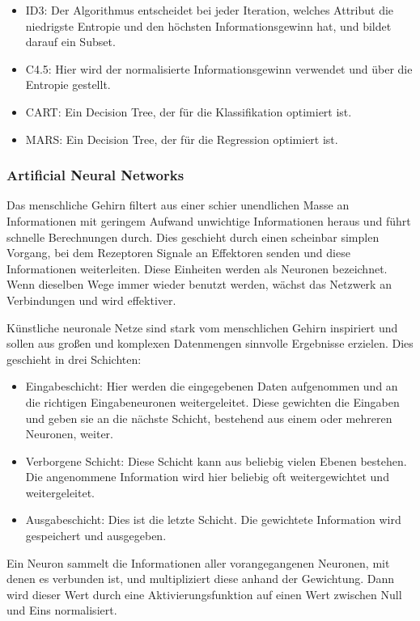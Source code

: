 \begin{itemize}
    \item ID3: Der Algorithmus entscheidet bei jeder Iteration, welches Attribut die niedrigste Entropie und den höchsten Informationsgewinn hat, und bildet darauf ein Subset.
    \item C4.5: Hier wird der normalisierte Informationsgewinn verwendet und über die Entropie gestellt.
    \item CART: Ein Decision Tree, der für die Klassifikation optimiert ist.
    \item MARS: Ein Decision Tree, der für die Regression optimiert ist.
\end{itemize}

\subsubsection{Artificial Neural Networks}
Das menschliche Gehirn filtert aus einer schier unendlichen Masse an Informationen mit geringem Aufwand unwichtige Informationen heraus und führt schnelle Berechnungen durch. Dies geschieht durch einen scheinbar simplen Vorgang, bei dem Rezeptoren Signale an Effektoren senden und diese Informationen weiterleiten. Diese Einheiten werden als Neuronen bezeichnet. Wenn dieselben Wege immer wieder benutzt werden, wächst das Netzwerk an Verbindungen und wird effektiver.\cite{stiftung2023nervensystem}

Künstliche neuronale Netze sind stark vom menschlichen Gehirn inspiriert und sollen aus großen und komplexen Datenmengen sinnvolle Ergebnisse erzielen. Dies geschieht in drei Schichten:\cite{wuttke2023neuronale}

\begin{itemize}
    \item Eingabeschicht: Hier werden die eingegebenen Daten aufgenommen und an die richtigen Eingabeneuronen weitergeleitet. Diese gewichten die Eingaben und geben sie an die nächste Schicht, bestehend aus einem oder mehreren Neuronen, weiter.
    \item Verborgene Schicht: Diese Schicht kann aus beliebig vielen Ebenen bestehen. Die angenommene Information wird hier beliebig oft weitergewichtet und weitergeleitet.
    \item Ausgabeschicht: Dies ist die letzte Schicht. Die gewichtete Information wird gespeichert und ausgegeben.
\end{itemize}

Ein Neuron sammelt die Informationen aller vorangegangenen Neuronen, mit denen es verbunden ist, und multipliziert diese anhand der Gewichtung. Dann wird dieser Wert durch eine Aktivierungsfunktion auf einen Wert zwischen Null und Eins normalisiert.\cite{arnx2019first}

